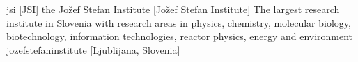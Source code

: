 \newglsXinstitution%
{jsi}%
[JSI]%
{the Jo\v{z}ef Stefan Institute}%
[Jo\v{z}ef Stefan Institute]%
{The largest research institute in Slovenia with research areas in physics, chemistry, molecular biology, biotechnology, information technologies, reactor physics, energy and environment \cite{website:Jozef_Stefan_Institute}}%
{jozefstefaninstitute}%
[Ljublijana, Slovenia]%